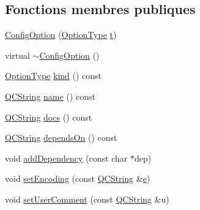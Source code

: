 \subsection*{Fonctions membres publiques}
\begin{DoxyCompactItemize}
\item 
\hyperlink{class_config_option_a3ce6753bba05ab1ee7e5eaaec6d8f1ac}{Config\+Option} (\hyperlink{class_config_option_ad60cb308cdf307e72796dc2fc2a40fda}{Option\+Type} \hyperlink{058__bracket__recursion_8tcl_a69e959f6901827e4d8271aeaa5fba0fc}{t})
\item 
virtual \hyperlink{class_config_option_ae9ef259a262e4422ade948313b6dd74a}{$\sim$\+Config\+Option} ()
\item 
\hyperlink{class_config_option_ad60cb308cdf307e72796dc2fc2a40fda}{Option\+Type} \hyperlink{class_config_option_a9c75888abf6d37cfe9d00ac40ecc474d}{kind} () const 
\item 
\hyperlink{class_q_c_string}{Q\+C\+String} \hyperlink{class_config_option_a2f226c32b0c447c1fa628660f42859c4}{name} () const 
\item 
\hyperlink{class_q_c_string}{Q\+C\+String} \hyperlink{class_config_option_aca53064314cae27e5e650c780c10015c}{docs} () const 
\item 
\hyperlink{class_q_c_string}{Q\+C\+String} \hyperlink{class_config_option_acd3c60d9556e68951d43dc3422024cdb}{depends\+On} () const 
\item 
void \hyperlink{class_config_option_a290d4454155543728847a75ade256a32}{add\+Dependency} (const char $\ast$dep)
\item 
void \hyperlink{class_config_option_a0ac357ec83d2014603c8d70a00c27a33}{set\+Encoding} (const \hyperlink{class_q_c_string}{Q\+C\+String} \&\hyperlink{060__command__switch_8tcl_aff65a51a703804e0ad1adbcfd76c86f8}{e})
\item 
void \hyperlink{class_config_option_a5baa3fb6c4fb6ec667eb91172f3f398a}{set\+User\+Comment} (const \hyperlink{class_q_c_string}{Q\+C\+String} \&u)
\end{DoxyCompactItemize}
